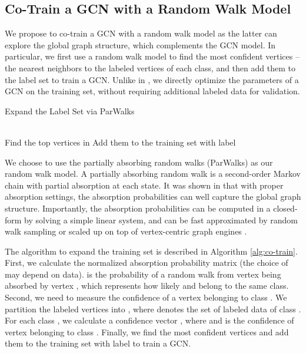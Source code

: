 \documentclass[letterpaper]{article} \usepackage{aaai18}  \usepackage{times}  \usepackage{helvet}  \usepackage{courier}  \usepackage{url}  \usepackage{graphicx}  \usepackage{algorithm}
\begin{document}
\subsection{Co-Train a GCN with a Random Walk Model}

We propose to co-train a GCN with a random walk model as the latter can explore the global graph structure, which complements the GCN model. In particular, we first use a random walk model to find the most confident vertices -- the nearest neighbors to the labeled vertices of each class, and then add them to the label set to train a GCN. Unlike in \cite{kipf2016semi}, we directly optimize the parameters of a GCN on the training set, without requiring additional labeled data for validation.

\begin{algorithm}
    \caption{Expand the Label Set via ParWalks}\label{alg:co-train}
    \label{parwalk}
    \begin{algorithmic}[1]
    \STATE 
    \STATE   \\
     \STATE Find the top  vertices in  \STATE Add them to the training set with label 
\ENDFOR
    \end{algorithmic}
\end{algorithm}




We choose to use the partially absorbing random walks (ParWalks) \cite{Wu12parw} as our random walk model. A partially absorbing random walk is a second-order Markov chain with partial absorption at each state. It was shown in \cite{nips13_harmonic} that with proper absorption settings, the absorption probabilities can well capture the global graph structure. Importantly, the absorption probabilities can be computed in a closed-form by solving a simple linear system, and can be fast approximated by random walk sampling or scaled up on top of vertex-centric graph engines \cite{guo2017graph}.






The algorithm to expand the training set is described in Algorithm \ref{alg:co-train}.
First, we calculate the normalized absorption probability matrix  (the choice of  may depend on data).  is the probability of a random walk from vertex  being absorbed by vertex , which represents how likely  and  belong to the same class. Second, we need to measure the confidence of a vertex belonging to class . We partition the labeled vertices into , where  denotes the set of labeled data of class . For each class , we calculate a confidence vector ,
where  and  is the confidence of vertex  belonging to class . Finally, we find the  most confident vertices and add them to the training set with label  to train a GCN.
\end{document}
